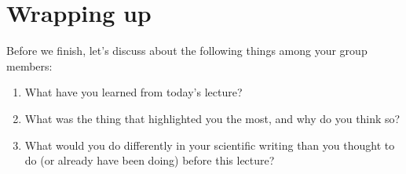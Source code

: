 \documentclass{article}
\begin{document}
\section{Wrapping up}
Before we finish, let's discuss about the following things among your group members:
\begin{enumerate}
    \item What have you learned from today's lecture?
    \vspace{2in}
    \item What was the thing that highlighted you the most, and why do you think so?
    \vspace{2in}
    \item What would you do differently in your scientific writing than you thought to do (or already have been doing) before this lecture?
    \vspace{2in}
\end{enumerate}

\newpage
\*
\newpage



\end{document}
